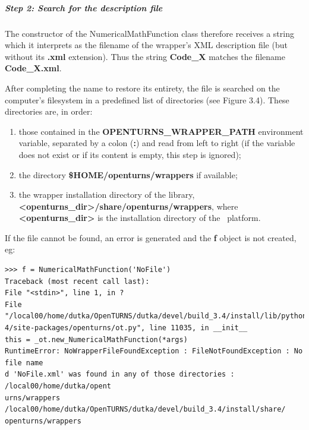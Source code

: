 \subparagraph{Step 2: Search for the description file}

The constructor of the NumericalMathFunction class therefore receives a string which it interprets as the filename of the wrapper's XML description file (but without its {\bf .xml} extension). Thus the string {\bf Code\_X} matches the filename {\bf Code\_X.xml}.

After completing the name to restore its entirety, the file is searched on the computer's filesystem in a predefined list of directories (see Figure 3.4). These directories are, in order:

\begin{enumerate}
\item those contained in the {\bf OPENTURNS\_WRAPPER\_PATH} environment variable, separated by a colon ({\bf :}) and read from left to right (if the variable does not exist or if its content is empty, this step is ignored);
\item the directory {\bf \$HOME/openturns/wrappers} if available;
\item the wrapper installation directory of the library, {\bf <openturns\_dir>/share/openturns/wrappers}, where {\bf <openturns\_dir>} is the installation directory of the \OT\ platform.
\end{enumerate}

If the file cannot be found, an error is generated and the {\bf f} object is not created, eg:

\lstset{language=Python, basicstyle=\normalsize}
\begin{lstlisting}[frame=TBRL]
>>> f = NumericalMathFunction('NoFile')
Traceback (most recent call last):
File "<stdin>", line 1, in ?
File "/local00/home/dutka/OpenTURNS/dutka/devel/build_3.4/install/lib/python2.
4/site-packages/openturns/ot.py", line 11035, in __init__
this = _ot.new_NumericalMathFunction(*args)
RuntimeError: NoWrapperFileFoundException : FileNotFoundException : No file name
d 'NoFile.xml' was found in any of those directories : /local00/home/dutka/opent
urns/wrappers /local00/home/dutka/OpenTURNS/dutka/devel/build_3.4/install/share/
openturns/wrappers
\end{lstlisting}

